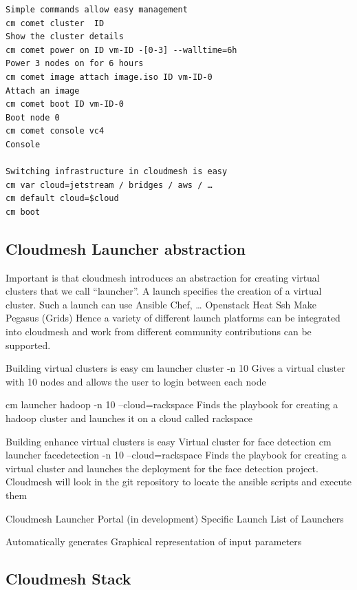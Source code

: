 \begin{Verbatim}
Simple commands allow easy management
cm comet cluster  ID
Show the cluster details
cm comet power on ID vm-ID -[0-3] --walltime=6h
Power 3 nodes on for 6 hours
cm comet image attach image.iso ID vm-ID-0
Attach an image
cm comet boot ID vm-ID-0
Boot node 0
cm comet console vc4
Console 

Switching infrastructure in cloudmesh is easy
cm var cloud=jetstream / bridges / aws / …
cm default cloud=$cloud
cm boot
\end{Verbatim}

\subsection{Cloudmesh Launcher abstraction}
Important is that cloudmesh introduces an abstraction for creating virtual clusters that we call “launcher”. A launch specifies the creation of a virtual cluster. Such a launch can use
Ansible
Chef, …
Openstack Heat
Ssh
Make
Pegasus (Grids)
Hence a variety of different launch platforms can be integrated into cloudmesh and work from different community contributions can be supported.

Building virtual clusters is easy
cm launcher cluster -n 10
Gives a virtual cluster with 10 nodes and allows the user to login between each node


cm launcher hadoop -n 10 --cloud=rackspace
Finds the playbook for creating a hadoop cluster and launches it on a cloud called rackspace



Building enhance virtual clusters is easy
Virtual cluster for face detection
cm launcher facedetection -n 10 --cloud=rackspace
Finds the playbook for creating a virtual cluster and launches the deployment for the face detection project.
Cloudmesh will look in the git repository to locate the ansible scripts and execute them


Cloudmesh Launcher Portal (in development)
       Specific Launch                                    List of Launchers





Automatically generates Graphical representation of input parameters                                  


\subsection{Cloudmesh Stack}
\label{S:stacks}

